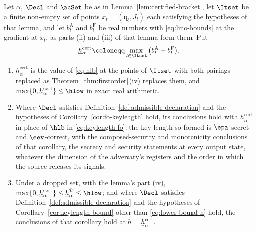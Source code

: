 \begin{corollary}\label{cor:certified-keylength}
Let $\alpha$, $\Decl$ and $\acSet$ be as in
Lemma~\ref{lem:certified-bracket}, let $\Itset$ be a finite non-empty set of
points $x_t=(\mathbf q_t,J_t)$ each satisfying the hypotheses of that lemma,
and let $b^{\mathrm A}_t$ and $b^{\mathrm F}_t$ be real numbers with
\eqref{eq:lmo-bounds} at the gradient at $x_t$, as parts (ii) and (iii) of
that lemma form them. Put
\begin{equation}\label{eq:hcert}
  \underline{h}^{\mathrm{cert}}_{\alpha}\coloneqq
  \max_{t\in\Itset}\big(b^{\mathrm A}_t+b^{\mathrm F}_t\big).
\end{equation}
\begin{enumerate}[label=(\roman*),leftmargin=2.4em]
\item $\underline{h}^{\mathrm{cert}}_{\alpha}$ is the value of \eqref{eq:hlb}
  at the points of $\Itset$ with both pairings replaced as
  Theorem~\ref{thm:firstorder}\,(iv) replaces them, and
  $\max\{0,\underline{h}^{\mathrm{cert}}_{\alpha}\}\le\hlow$ in exact real
  arithmetic.
\item Where $\Decl$ satisfies Definition~\ref{def:admissible-declaration} and
  the hypotheses of Corollary~\ref{cor:fo-keylength} hold, its conclusions
  hold with $\underline{h}^{\mathrm{cert}}_{\alpha}$ in place of $\hlb$ in
  \eqref{eq:keylength-fo}: the key length so formed is $\epa$-secret and
  $\eev$-correct, with the composed-security and monotonicity conclusions of
  that corollary, the secrecy and security statements at every output
  state, whatever the dimension of the adversary's registers and the order
  in which the source releases its signals.
\item Under a dropped set, with the lemma's part (iv),
  $\max\{0,\underline{h}^{\mathrm{cert}}_{\alpha}\}\le
  \underline{h}^{\mathcal{D}}_{\alpha}\le\hlow$; and where $\Decl$
  satisfies Definition~\ref{def:admissible-declaration} and the hypotheses
  of Corollary~\ref{cor:keylength-bound} other than
  \eqref{eq:lower-bound-h} hold, the conclusions of that corollary hold at
  $h=\underline{h}^{\mathrm{cert}}_{\alpha}$.
\end{enumerate}
\end{corollary}

